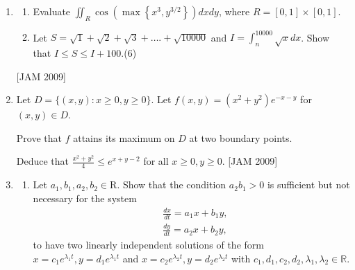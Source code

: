 \begin{enumerate}
\begin{enumerate}
\item  Define $f: \mathrm{N} \times \mathrm{N} \rightarrow \mathrm{R}$ by
$$
f(m, n)=\left\{\begin{array}{lll}
0 & \text { if } n>m, \\
\frac{-1}{2^{m-n}} & \text { if } n<m, \\
1 & \text { if } n=m .
\end{array}\right.
$$
Show that $\sum_{m=1}^{\infty} \sum_{n=1}^{\infty} f(m, n)=2$ and $\sum_{n=1}^{\infty} \sum_{m=1}^{\infty} f(m, n)=0$.
\end{enumerate}
\hfill [JAM 2009]



\item  
\begin{enumerate}
   \item Evaluate $\iint_{R} \cos \left(\max \left\{x^{3}, y^{3 / 2}\right\}\right) d x d y$, where $R=[0,1] \times[0,1]$.

\item  Let $S=\sqrt{1}+\sqrt{2}+\sqrt{3}+\ldots .+\sqrt{10000}$ and $I=\int_{n}^{10000} \sqrt{x} d x$. Show that $I \leq S \leq I+100$.(6)
 
\end{enumerate}
\hfill [JAM 2009]


\item  Let $D=\{(x, y): x \geq 0, y \geq 0\}$. Let $f(x, y)=\left(x^{2}+y^{2}\right) e^{-x-y}$ for $(x, y) \in D$.

Prove that $f$ attains its maximum on $D$ at two boundary points.

Deduce that $\frac{x^{2}+y^{2}}{4} \leq e^{x+y-2}$ for all $x \geq 0, y \geq 0$.
\hfill [JAM 2009]


\item  
\begin{enumerate}
    
\item Let $a_{1}, b_{1}, a_{2}, b_{2} \in \mathrm{R}$. Show that the condition $a_{2} b_{1}>0$ is sufficient but not necessary for the system
$$
\begin{aligned}
&\frac{d x}{d t}=a_{1} x+b_{1} y, \\
&\frac{d y}{d t}=a_{2} x+b_{2} y,
\end{aligned}
$$
to have two linearly independent solutions of the form $x=c_{1} e^{\lambda_{1} t}, y=d_{1} e^{\lambda_{1} t}$ and $x=c_{2} e^{\lambda_{2} t}, y=d_{2} e^{\lambda_{2} t}$ with $c_{1}, d_{1}, c_{2}, d_{2}, \lambda_{1}, \lambda_{2} \in \mathbb{R}$.


\end{enumerate}
\end{enumerate}
